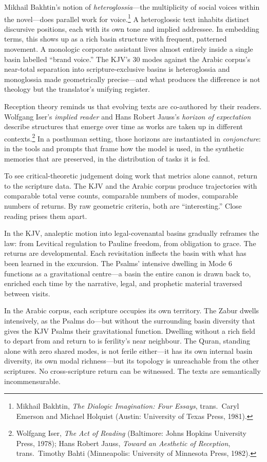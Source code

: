 Mikhail Bakhtin's notion of \emph{heteroglossia}---the multiplicity of social voices within the novel---does parallel work for voice.\footnote{Mikhail Bakhtin, \emph{The Dialogic Imagination: Four Essays}, trans.\ Caryl Emerson and Michael Holquist (Austin: University of Texas Press, 1981).} A heteroglossic text inhabits distinct discursive positions, each with its own tone and implied addressee. In embedding terms, this shows up as a rich basin structure with frequent, patterned movement. A monologic corporate assistant lives almost entirely inside a single basin labelled ``brand voice.'' The KJV's 30 modes against the Arabic corpus's near-total separation into scripture-exclusive basins is heteroglossia and monoglossia made geometrically precise---and what produces the difference is not theology but the translator's unifying register.

Reception theory reminds us that evolving texts are co-authored by their readers. Wolfgang Iser's \emph{implied reader} and Hans Robert Jauss's \emph{horizon of expectation} describe structures that emerge over time as works are taken up in different contexts.\footnote{Wolfgang Iser, \emph{The Act of Reading} (Baltimore: Johns Hopkins University Press, 1978); Hans Robert Jauss, \emph{Toward an Aesthetic of Reception}, trans.\ Timothy Bahti (Minneapolis: University of Minnesota Press, 1982).} In a posthuman setting, those horizons are instantiated in \emph{conjoncture}: in the tools and prompts that frame how the model is used, in the synthetic memories that are preserved, in the distribution of tasks it is fed.

To see critical-theoretic judgement doing work that metrics alone cannot, return to the scripture data. The KJV and the Arabic corpus produce trajectories with comparable total verse counts, comparable numbers of modes, comparable numbers of returns. By raw geometric criteria, both are ``interesting.'' Close reading prises them apart.

In the KJV, analeptic motion into legal-covenantal basins gradually reframes the law: from Levitical regulation to Pauline freedom, from obligation to grace. The returns are developmental. Each revisitation inflects the basin with what has been learned in the excursion. The Psalms' intensive dwelling in Mode 6 functions as a gravitational centre---a basin the entire canon is drawn back to, enriched each time by the narrative, legal, and prophetic material traversed between visits.

In the Arabic corpus, each scripture occupies its own territory. The Zabur dwells intensively, as the Psalms do---but without the surrounding basin diversity that gives the KJV Psalms their gravitational function. Dwelling without a rich field to depart from and return to is ferility's near neighbour. The Quran, standing alone with zero shared modes, is not ferile either---it has its own internal basin diversity, its own modal richness---but its topology is unreachable from the other scriptures. No cross-scripture return can be witnessed. The texts are semantically incommensurable.

